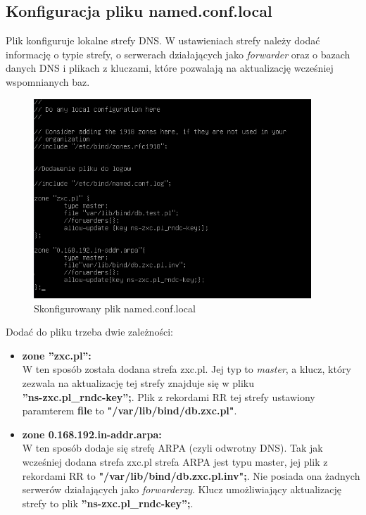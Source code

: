 \documentclass[12pt, a4paper]{article}
\begin{document}
    \subsection{Konfiguracja pliku named.conf.local}
        Plik konfiguruje lokalne strefy DNS. W ustawieniach strefy należy dodać informację o typie strefy, o serwerach działających jako \textit{forwarder} oraz o bazach danych DNS i plikach z kluczami, które pozwalają na aktualizację wcześniej wspomnianych baz.
        \begin{figure}[!h]
            \centering
            \includegraphics[width=0.93\textwidth]{4.PNG}
            \caption{Skonfigurowany plik named.conf.local}
            \label{fig:named_conf_local}
        \end{figure}

\pagebreak

        Dodać do pliku trzeba dwie zależności:
        \begin{itemize}
            \item \textbf{zone ''zxc.pl'':} \\ W ten sposób została dodana strefa zxc.pl. Jej typ to \textit{master}, a klucz, który zezwala na aktualizację tej strefy znajduje się w pliku \\ \textbf{''ns-zxc.pl\_rndc-key'';}. Plik z rekordami RR tej strefy ustawiony paramterem \textbf{file} to \textbf{"/var/lib/bind/db.zxc.pl"}.
            \item \textbf{zone 0.168.192.in-addr.arpa:} \\ W ten sposób dodaje się strefę ARPA (czyli odwrotny DNS). Tak jak wcześniej dodana strefa zxc.pl strefa ARPA jest typu master, jej plik z rekordami RR to \textbf{"/var/lib/bind/db.zxc.pl.inv";}. Nie posiada ona żadnych serwerów działających jako \textit{forwarderzy}. Klucz umożliwiający aktualizację strefy to plik \textbf{''ns-zxc.pl\_rndc-key'';}.
        \end{itemize}
            
\end{document}
